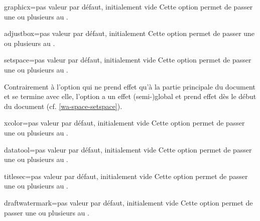 \begin{docKey}{graphicx}{=}{pas valeur par défaut,
    initialement vide}
  Cette option permet de passer une ou plusieurs  au
  .
\end{docKey}
\begin{docKey}{adjustbox}{=}{pas valeur par défaut,
    initialement }
  Cette option permet de passer une ou plusieurs  au
  .
\end{docKey}
\begin{docKey}{setspace}{=}{pas valeur par défaut,
    initialement vide}
  Cette option permet de passer une ou plusieurs  au
  .

  Contrairement à l'option  qui ne prend effet qu'à la partie
  principale du document et se termine avec elle, l'option 
  a un effet (semi-)global et prend effet dès le début du document
  (cf. \vref{wa-space-setspace}).
\end{docKey}
\begin{docKey}{xcolor}{=}{pas valeur par défaut,
    initialement vide}
  Cette option permet de passer une ou plusieurs  au
  .
\end{docKey}
\begin{docKey}{datatool}{=}{pas valeur par défaut,
    initialement vide}
  Cette option permet de passer une ou plusieurs  au
  .
\end{docKey}
\begin{docKey}{titlesec}{=}{pas valeur par défaut, initialement
    vide}
  Cette option permet de passer une ou plusieurs  au
  .
\end{docKey}
\begin{docKey}{draftwatermark}{=}{pas valeur par défaut,
    initialement vide}
  Cette option permet de passer une ou plusieurs  au
  .
\end{docKey}
